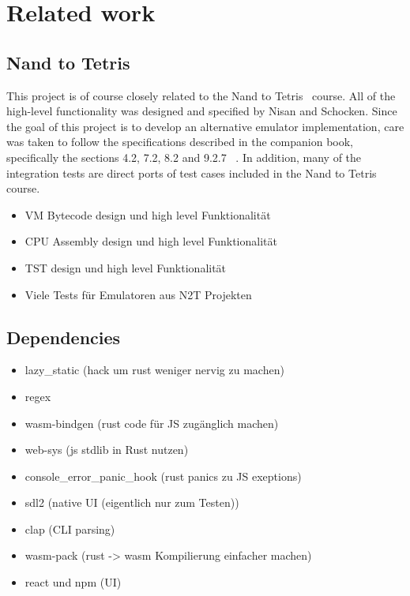 \section{Related work}

\subsection{Nand to Tetris}

This project is of course closely related to the Nand to Tetris~\cite{n2tweb} course. All of the high-level functionality was designed and specified by Nisan and Schocken.
Since the goal of this project is to develop an alternative emulator implementation, care was taken to follow the specifications described in the companion book, specifically the sections 4.2, 7.2, 8.2 and 9.2.7  ~\cite{nisan2005}.
In addition, many of the integration tests are direct ports of test cases included in the Nand to Tetris course.

\begin{itemize}
  \item VM Bytecode design und high level Funktionalität
  \item CPU Assembly design und high level Funktionalität
  \item TST design und high level Funktionalität
  \item Viele Tests für Emulatoren aus N2T Projekten
\end{itemize}

\subsection{Dependencies}

\begin{itemize}
\item lazy\_static (hack um rust weniger nervig zu machen)
\item regex
\item wasm-bindgen (rust code für JS zugänglich machen)
\item web-sys (js stdlib in Rust nutzen)
\item console\_error\_panic\_hook (rust panics zu JS exeptions)
\item sdl2 (native UI (eigentlich nur zum Testen))
\item clap (CLI parsing)
\item wasm-pack (rust -> wasm Kompilierung einfacher machen)
\item react und npm (UI)
\end{itemize}

